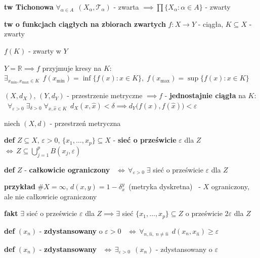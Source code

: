 \documentclass[a4paper,12pt]{article}
\begin{document}
\bigskip
\textbf{tw Tichonowa} \; \(\forall_{\alpha \in A} \;\, (X_\alpha, \mathcal{T}_\alpha)\) - zwarta \(\implies \prod \{X_\alpha : \alpha \in A\}\) - zwarty

\bigskip
\textbf{tw o funkcjach ciągłych na zbiorach zwartych} \; \(f: X \to Y\) - ciągła, \; \(K \subseteq X\) - zwarty
\begin{podpunkty}
    \item \(f(K)\) - zwarty w \(Y\)
    \item \(Y = \mathbb{R} \implies f\) przyjmuje kresy na \(K\): \, \(\exists_{x_{\min}, x_{\max} \in K} \;\, f(x_{\min}) = \inf \{f(x) : x \in K\}, \; f(x_{\max}) = \sup \{f(x) : x \in K\}\)
    \item \((X, d_X), \, (Y, d_Y)\) - przestrzenie metryczne \(\implies f\) - \textbf{jednostajnie ciągła} na \(K\): \, \(\forall_{\varepsilon > 0} \; \exists_{\delta > 0} \; \forall_{x, \hat{x} \in K} \;\, d_X(x, \hat{x}) < \delta \implies d_Y\big(f(x), f(\hat{x})\big) < \varepsilon\)
\end{podpunkty}

\bigskip
niech \((X, d)\) - przestrzeń metryczna

\bigskip
\textbf{def} \; \(Z \subseteq X\), \; \(\varepsilon > 0\), \; \(\{x_1, \dots, x_p\} \subseteq X\) - \textbf{sieć o prześwicie} \(\varepsilon\) dla \(Z\) \, \(\iff \, Z \subseteq \bigcup_{j=1}^{p} B(x_j, \varepsilon)\)

\smallskip
\textbf{def} \; \(Z\) - \textbf{całkowicie ograniczony} \, \(\iff \, \forall_{\varepsilon > 0} \; \exists\) sieć o prześwicie \(\varepsilon\) dla \(Z\)

\bigskip
\begin{logbox}
\textbf{przykład} \; \(\#X = \infty\), \; \(d(x, y) = 1 - \delta_x^y\) \,(metryka dyskretna) \, - \(X\) ograniczony, ale nie całkowicie ograniczony
\end{logbox}

\bigskip
\textbf{fakt} \; \(\exists\) sieć o prześwicie \(\varepsilon\) dla \(Z \implies \exists\) sieć \(\{x_1, \dots, x_p\} \subseteq Z\) o prześwicie \(2\varepsilon\) dla \(Z\)

\bigskip
\textbf{def} \; \((x_n)\) - \textbf{zdystansowany} o \(\varepsilon > 0\) \, \(\iff \, \forall_{n, \hat{n}, \; n \neq \hat{n}} \;\, d(x_n, x_{\hat{n}}) \geq \varepsilon\)

\smallskip
\textbf{def} \; \((x_n)\) - \textbf{zdystansowany} \, \(\iff \, \exists_{\varepsilon > 0} \;\, (x_n)\) - zdystansowany o \(\varepsilon\)
\end{document}
